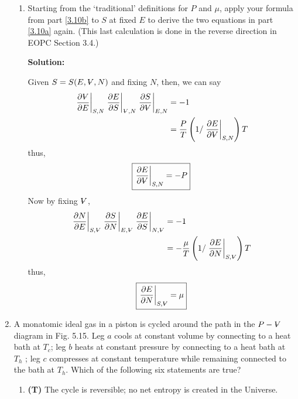 \documentclass[10pt]{article}
\newenvironment{Solution}
    {\textbf{Solution:}
    
    \vspace{5mm}
    \begin{tcolorbox}
    }
    {
    \end{tcolorbox}
    \vspace{5mm}
    }
\newcommand{\vol}{{\ooalign{\hfil$V$\hfil\cr\kern0.08em--\hfil\cr}}}
\begin{document}
\begin{enumerate}
\begin{enumerate}
    \item Starting from the ‘traditional’ definitions for $P$ and $\mu$, apply your formula from part \ref{3.10b} to $S$ at fixed $E$ to derive the two equations in part \ref{3.10a} again. (This last calculation is done in the reverse direction in EOPC Section 3.4.)
    
    \begin{Solution}
    
    Given $S = S(E,\vol,N)$ and fixing $N$, then, we can say
    \begin{align}
        \left.\frac{\partial \vol}{\partial E}\right|_{S,N} \left.\frac{\partial E}{\partial S}\right|_{\scriptsize{\vol},N} \left.\frac{\partial S}{\partial \vol}\right|_{E,N} &= -1\\
        &= \frac{P}{T}\left(1 /\left.\frac{\partial E}{\partial \vol}\right|_{S, N}\right) T
    \end{align}
    thus,
    \begin{equation}
        \boxed{
        \left.\frac{\partial E}{\partial \vol}\right|_{S, N} = -P
        }
    \end{equation}
    Now by fixing $\vol$,
    \begin{align}
        \left.\frac{\partial N}{\partial E}\right|_{S, \scriptsize{\vol}} \left.\frac{\partial S}{\partial N}\right|_{E, \scriptsize{\vol}} \left.\frac{\partial E}{\partial S}\right|_{N, \scriptsize{\vol}} &= -1\\
        &= -\frac{\mu}{T}\left(1 /\left.\frac{\partial E}{\partial N}\right|_{S, \scriptsize{\vol}}\right) T
    \end{align}
    thus,
    \begin{equation}
        \boxed{
        \left.\frac{\partial E}{\partial N}\right|_{S, \scriptsize{\vol}} = \mu
        }
    \end{equation}
        
    \end{Solution}
\end{enumerate}

\item A monatomic ideal gas in a piston is cycled around the path in the $P -\vol$ diagram in Fig. 5.15. Leg $a$ cools at constant volume by connecting to a heat bath at $T_c$; leg $b$ heats at constant pressure by connecting to a heat bath at $T_h$ ; leg $c$ compresses at constant temperature while remaining connected to the bath at $T_h$.
Which of the following six statements are true?
\begin{enumerate}
    \item \textbf{(T)} The cycle is reversible; no net entropy is created in the Universe.
    

\end{enumerate}
\end{enumerate}
\end{document}
